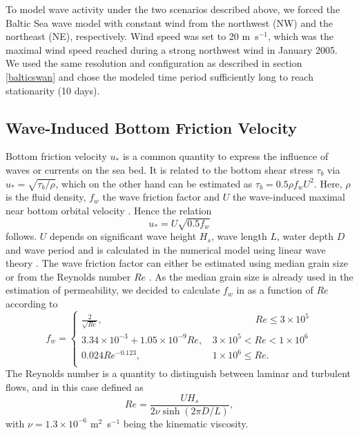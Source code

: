 To model wave activity under the two scenarios described above, we forced the 
Baltic Sea wave model with constant wind from the northwest (NW) and the 
northeast (NE), respectively. Wind speed was set to 20 m~s$^{-1}$, which was 
the maximal wind speed reached during a strong northwest wind in January 2005.
We used the same resolution and configuration as described in 
section \ref{balticswan} and chose the modeled time period sufficiently long to 
reach stationarity (10 days).

\subsection{Wave-Induced Bottom Friction Velocity}

Bottom friction velocity $u_\ast$ is a common quantity to express the influence 
of waves or currents on the sea bed. It is related to the bottom shear stress 
$\tau_b$ via $u_\ast = \sqrt{\tau_b \slash \rho}$, which on the other hand can 
be estimated as $\tau_b = 0.5 \rho f_w U^2$. Here, $\rho$ is the fluid 
density, $f_w$ the wave friction factor and $U$ the wave-induced
maximal near bottom orbital velocity \citep[][]{schwartz2006}. Hence the 
relation
\begin{equation}
 \label{ustar}
 u_\ast = U \sqrt{0.5 f_w}
\end{equation}
follows. $U$ depends on significant wave height $H_s$, wave length 
$L$, water depth $D$ and wave period and is calculated in the numerical 
model using linear wave theory \citep[][]{holthuijsen2007, schwartz2006}. The 
wave friction factor can either be estimated using median grain size 
\citep[][]{swart1974, nielsen1992} or from the Reynolds number $Re$ 
\citep[][]{nielsen1992, jonsson2004}. As the median grain size is already used 
in the estimation of permeability, we decided to calculate $f_w$ in as a 
function of $Re$ according to
\begin{equation}
 \label{fw}
 f_w = \left\{ \begin{array}{lll}
             \frac{2}{\sqrt{Re}}, & \qquad \qquad \; \,  Re \leq 3 \times 10^5 
\\
              3.34 \times 10^{-3} + 1.05 \times 10^{-9} Re, \, &3 \times 10^5 < 
							  Re < 1 \times 10^6 \\
	      0.024 Re^{-0.123}, \, &1 \times 10^6 \leq Re. \\
              \end{array} 
              \right. 
\end{equation}
The Reynolds number is a quantity to distinguish between laminar and turbulent 
flows, and in this case defined as
\begin{equation}
 \label{reynolds}
 Re = \frac{U H_s}{2 \nu \sinh (2 \pi D \slash L) },
\end{equation}
with $\nu = 1.3 \times 10^{-6}$ m$^2$~s$^{-1}$ being the kinematic viscosity.
